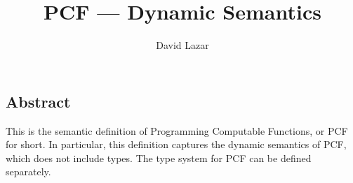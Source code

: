 \setlength{\parindent}{1em}
\title{PCF --- Dynamic Semantics}
\author{David Lazar}

\maketitle

\begin{latexComment}
\section*{Abstract}
This is the \K semantic definition of Programming Computable Functions, or PCF for short. In particular, this definition captures the dynamic semantics of PCF, which does not include types. The type system for PCF can be defined separately.
\end{latexComment}

\vspace*{3ex}
